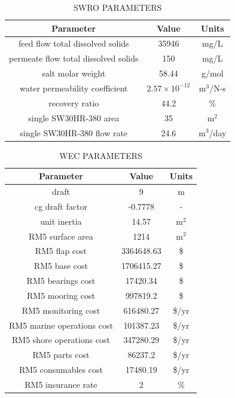 \documentclass[twocolumn,10pt]{asme2e}
\begin{document}
\begin{table}[h]
    \centering
    \caption{SWRO PARAMETERS}
    \begin{tabular}{ccc}
        \hline
        \textbf{Parameter} & \textbf{Value} & \textbf{Units} \\
        \hline
        feed flow total dissolved solids & 35946 \cite{Yu2018} & mg/L \\
        permeate flow total dissolved solids & 150 \cite{Yu2018} & mg/L \\
        salt molar weight & 58.44 & g/mol \\
        water permeability coefficient & $2.57\times10^{-12}$ \cite{Yu2018} & m$^3$/N-s \\
        recovery ratio & 44.2 \cite{wave} & \% \\
        single SW30HR-380 area & 35 \cite{SW30HR380} & m$^2$ \\
        single SW30HR-380 flow rate & 24.6 \cite{SW30HR380} & m$^3$/day \\
        \hline
    \end{tabular}
    \label{tab:paramsswro}
\end{table}

\begin{table}[h]
    \centering
    \caption{WEC PARAMETERS}
    \begin{tabular}{ccc}
        \hline
        \textbf{Parameter} & \textbf{Value} & \textbf{Units} \\
        \hline
        draft & 9 & m \\
        cg draft factor & -0.7778 & - \\
        unit inertia & 14.57 & m$^2$ \\
        RM5 surface area & 1214 \cite{rm5} & m$^2$ \\
        RM5 flap cost & 3364648.63 \cite{rm5} & \$ \\
        RM5 base cost & 1706415.27 \cite{rm5} & \$ \\
        RM5 bearings cost & 17420.34 \cite{rm5} & \$ \\
        RM5 mooring cost & 997819.2 \cite{rm5} & \$ \\
        RM5 monitoring cost & 616480.27 \cite{rm5} & \$/yr \\
        RM5 marine operations cost & 101387.23 \cite{rm5} & \$/yr \\
        RM5 shore operations cost & 347280.29 \cite{rm5} & \$/yr \\
        RM5 parts cost & 86237.2 \cite{rm5} & \$/yr \\
        RM5 consumables cost & 17480.19 \cite{rm5} & \$/yr \\
        RM5 insurance rate & 2 \cite{rm5} & \% \\
        \hline
    \end{tabular}
    \label{tab:paramswec}
\end{table}
\end{document}

